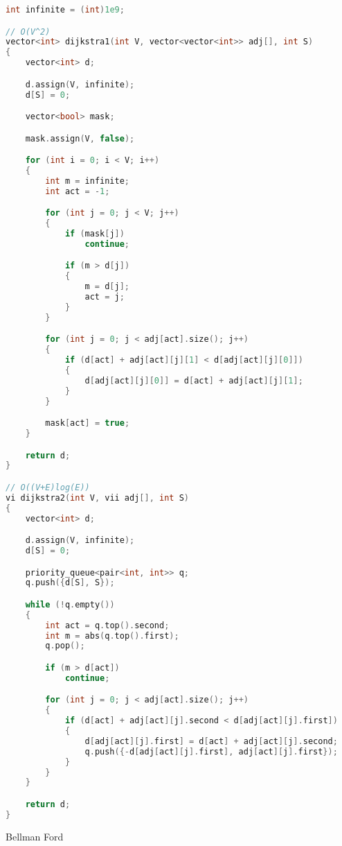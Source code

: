 \documentclass[leter]{amsart}
\begin{document}
\begin{multicols}{2}
\begin{lstlisting}[language=C++]
int infinite = (int)1e9;

// O(V^2)
vector<int> dijkstra1(int V, vector<vector<int>> adj[], int S)
{
    vector<int> d;

    d.assign(V, infinite);
    d[S] = 0;

    vector<bool> mask;

    mask.assign(V, false);

    for (int i = 0; i < V; i++)
    {
        int m = infinite;
        int act = -1;

        for (int j = 0; j < V; j++)
        {
            if (mask[j])
                continue;

            if (m > d[j])
            {
                m = d[j];
                act = j;
            }
        }

        for (int j = 0; j < adj[act].size(); j++)
        {
            if (d[act] + adj[act][j][1] < d[adj[act][j][0]])
            {
                d[adj[act][j][0]] = d[act] + adj[act][j][1];
            }
        }

        mask[act] = true;
    }

    return d;
}

// O((V+E)log(E))
vi dijkstra2(int V, vii adj[], int S)
{
    vector<int> d;

    d.assign(V, infinite);
    d[S] = 0;

    priority_queue<pair<int, int>> q;
    q.push({d[S], S});

    while (!q.empty())
    {
        int act = q.top().second;
        int m = abs(q.top().first);
        q.pop();

        if (m > d[act])
            continue;

        for (int j = 0; j < adj[act].size(); j++)
        {
            if (d[act] + adj[act][j].second < d[adj[act][j].first])
            {
                d[adj[act][j].first] = d[act] + adj[act][j].second;
                q.push({-d[adj[act][j].first], adj[act][j].first});
            }
        }
    }

    return d;
}

\end{lstlisting}
\end{multicols}
Bellman Ford
\end{document}
